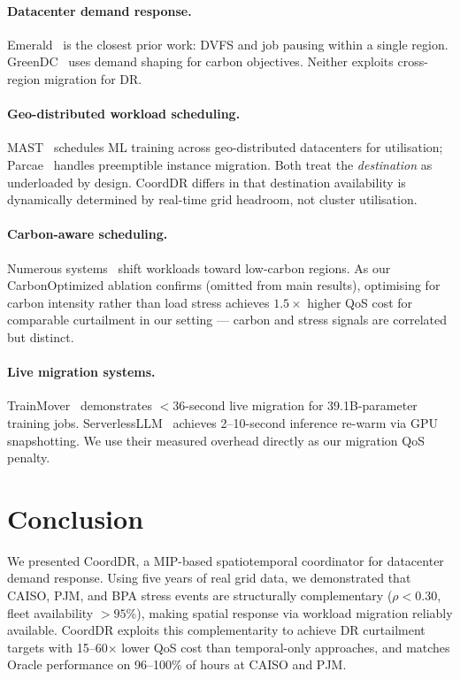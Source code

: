 \documentclass[sigplan,10pt,review]{acmart}
\newcommand{\sysname}{CoordDR\xspace}
\begin{document}
\paragraph{Datacenter demand response.}
Emerald~\cite{emerald2025} is the closest prior work: DVFS and job pausing
within a single region.  GreenDC~\cite{greendc2022} uses demand shaping for
carbon objectives.  Neither exploits cross-region migration for DR.

\paragraph{Geo-distributed workload scheduling.}
MAST~\cite{mast2024} schedules ML training across geo-distributed datacenters
for utilisation; Parcae~\cite{parcae2024} handles preemptible instance
migration.  Both treat the \emph{destination} as underloaded by design.
\sysname differs in that destination availability is dynamically determined by
real-time grid headroom, not cluster utilisation.

\paragraph{Carbon-aware scheduling.}
Numerous systems~\cite{casper2024,carbonsense2023} shift workloads toward
low-carbon regions.  As our CarbonOptimized ablation confirms (omitted from
main results), optimising for carbon intensity rather than load stress
achieves $1.5\times$ higher QoS cost for comparable curtailment in our
setting — carbon and stress signals are correlated but distinct.

\paragraph{Live migration systems.}
TrainMover~\cite{trainmover2024} demonstrates $<$36-second live migration
for 39.1B-parameter training jobs.  ServerlessLLM~\cite{serverlessllm2024}
achieves 2--10-second inference re-warm via GPU snapshotting.  We use their
measured overhead directly as our migration QoS penalty.


\section{Conclusion}
\label{sec:conclusion}

We presented \sysname, a MIP-based spatiotemporal coordinator for datacenter
demand response.  Using five years of real grid data, we demonstrated that
CAISO, PJM, and BPA stress events are structurally complementary
($\rho < 0.30$, fleet availability $>95\%$), making spatial response via
workload migration reliably available.  \sysname exploits this complementarity
to achieve DR curtailment targets with 15--60$\times$ lower QoS cost than
temporal-only approaches, and matches Oracle performance on 96--100\% of hours
at CAISO and PJM.
\end{document}
